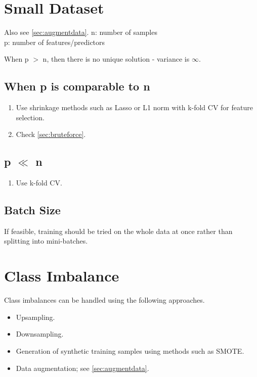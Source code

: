 \documentclass[a4paper, 12pt]{report}
\begin{document}
\section{Small Dataset}
Also see  \autoref{sec:augmentdata}.
\label{sec:smalldatasize}
n: number of samples\\
p: number of features/predictors


When p $>$ n, then there is no unique solution - variance is $\infty$.
\subsection{When p is comparable to n}
\begin{enumerate}

\item Use shrinkage methods such as Lasso or L1 norm with k-fold CV for feature selection.
\item Check  \autoref{sec:bruteforce}.

\end{enumerate}

\subsection{p ${\ll}$ n}
\begin{enumerate}
\item Use k-fold CV.
\end{enumerate}

\subsection{Batch Size}
If feasible, training should be tried on the whole data at once rather than splitting into mini-batches.



\section{Class Imbalance}
Class imbalances can be handled using the following approaches.
\begin{itemize}
\item Upsampling.
\item Downsampling.
\item Generation of synthetic training samples using methods such as SMOTE.
\item Data augmentation; see \autoref{sec:augmentdata}. 
\end{itemize}
\end{document}
